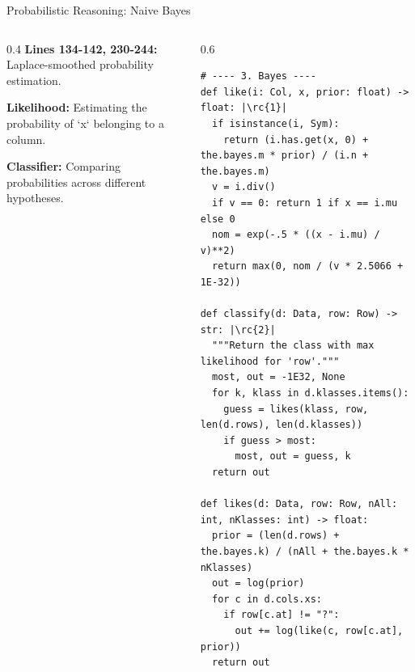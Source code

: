 \begin{frame}[fragile]{Probabilistic Reasoning: Naive Bayes}
\begin{columns}[T]
  \begin{column}{0.4\textwidth}
    \footnotesize 
    \textbf{Lines 134-142, 230-244:}\\
    Laplace-smoothed probability estimation.

    \vspace{0.2cm}
     \textbf{Likelihood:} Estimating the probability of `x` belonging to a column.
    
    \vspace{0.15cm}
     \textbf{Classifier:} Comparing probabilities across different hypotheses.
  \end{column}
  
  \begin{column}{0.6\textwidth}
\begin{verbatim}
# ---- 3. Bayes ----
def like(i: Col, x, prior: float) -> float: |\rc{1}|
  if isinstance(i, Sym):
    return (i.has.get(x, 0) + the.bayes.m * prior) / (i.n + the.bayes.m)
  v = i.div()
  if v == 0: return 1 if x == i.mu else 0
  nom = exp(-.5 * ((x - i.mu) / v)**2)
  return max(0, nom / (v * 2.5066 + 1E-32))

def classify(d: Data, row: Row) -> str: |\rc{2}|
  """Return the class with max likelihood for 'row'."""
  most, out = -1E32, None
  for k, klass in d.klasses.items():
    guess = likes(klass, row, len(d.rows), len(d.klasses))
    if guess > most:
      most, out = guess, k
  return out

def likes(d: Data, row: Row, nAll: int, nKlasses: int) -> float:
  prior = (len(d.rows) + the.bayes.k) / (nAll + the.bayes.k * nKlasses)
  out = log(prior)
  for c in d.cols.xs:
    if row[c.at] != "?":
      out += log(like(c, row[c.at], prior))
  return out
\end{verbatim}
  \end{column}
\end{columns}
\end{frame}
